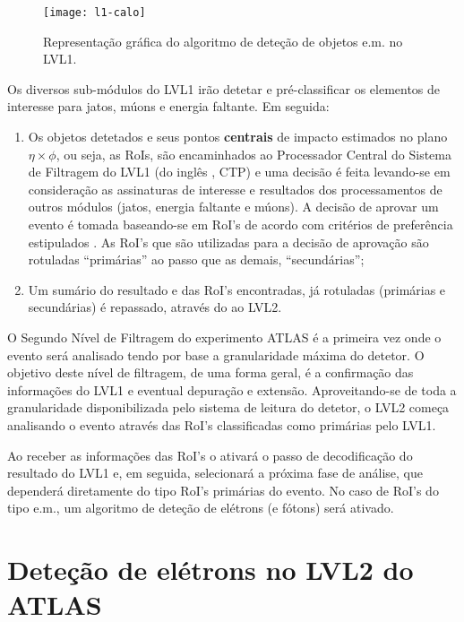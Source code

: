 \begin{figure}
\begin{center}
\texttt{[image: l1-calo]}
\end{center}
\caption{Representação gráfica do algoritmo de deteção de objetos e.m. no LVL1.}
\label{fig:l1-calo}
\end{figure}

Os diversos sub-módulos do LVL1 irão detetar e pré-classificar os elementos de
interesse para jatos, múons e energia faltante. Em seguida:

\begin{enumerate}
\item Os objetos detetados e seus pontos \textbf{centrais} de impacto
estimados no plano $\eta\times\phi$, ou seja, as RoIs, são encaminhados ao
Processador Central do Sistema de Filtragem do LVL1 (do inglês , CTP) e uma decisão é feita levando-se em consideração as
assinaturas de interesse e resultados dos processamentos de outros módulos
(jatos, energia faltante e múons). A decisão de aprovar um evento é tomada
baseando-se em RoI's de acordo com critérios de preferência estipulados . As RoI's que são utilizadas para a decisão de aprovação são rotuladas
``primárias'' ao passo que as demais, ``secundárias'';

\item Um sumário do resultado e das RoI's encontradas, já rotuladas (primárias
e secundárias) é repassado, através do  ao LVL2.
\end{enumerate}

O Segundo Nível de Filtragem do experimento ATLAS é a primeira vez onde o
evento será analisado tendo por base a granularidade máxima do detetor. O
objetivo deste nível de filtragem, de uma forma geral, é a confirmação das
informações do LVL1 e eventual depuração e extensão. Aproveitando-se de toda
a granularidade disponibilizada pelo sistema de leitura do detetor, o LVL2
começa analisando o evento através das RoI's classificadas como primárias pelo
LVL1.

Ao receber as informações das RoI's o  ativará o passo de
decodificação do resultado do LVL1 e, em seguida, selecionará a próxima fase
de análise, que dependerá diretamente do tipo RoI's primárias do evento. No
caso de RoI's do tipo e.m., um algoritmo de deteção de elétrons (e fótons)
será ativado.

\section{Deteção de elétrons no LVL2 do ATLAS}
\label{sec:classic-detection}

